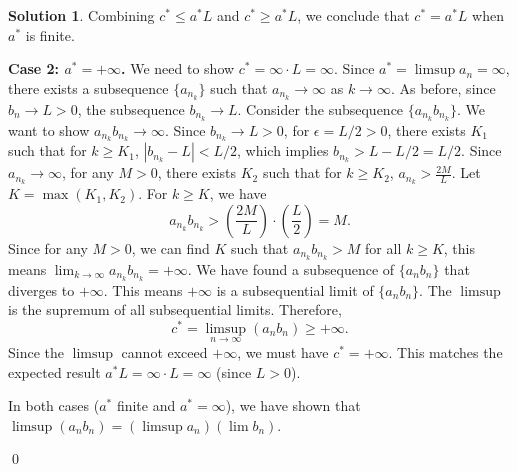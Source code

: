 \documentclass[12pt,oneside]{article}
\theoremstyle{definition}
\newtheorem*{solution}{Solution} %
\begin{document}
\begin{solution}
Combining $c^* \le a^* L$ and $c^* \ge a^* L$, we conclude that $c^* = a^* L$ when $a^*$ is finite.

\textbf{Case 2: $a^* = +\infty$.}
We need to show $c^* = \infty \cdot L = \infty$.
Since $a^* = \limsup a_n = \infty$, there exists a subsequence $\{a_{n_k}\}$ such that $a_{n_k} \to \infty$ as $k \to \infty$.
As before, since $b_n \to L > 0$, the subsequence $b_{n_k} \to L$.
Consider the subsequence $\{a_{n_k} b_{n_k}\}$. We want to show $a_{n_k} b_{n_k} \to \infty$.
Since $b_{n_k} \to L > 0$, for $\epsilon = L/2 > 0$, there exists $K_1$ such that for $k \ge K_1$, $|b_{n_k} - L| < L/2$, which implies $b_{n_k} > L - L/2 = L/2$.
Since $a_{n_k} \to \infty$, for any $M > 0$, there exists $K_2$ such that for $k \ge K_2$, $a_{n_k} > \frac{2M}{L}$.
Let $K = \max(K_1, K_2)$. For $k \ge K$, we have
\[ a_{n_k} b_{n_k} > \left( \frac{2M}{L} \right) \cdot \left( \frac{L}{2} \right) = M. \]
Since for any $M > 0$, we can find $K$ such that $a_{n_k} b_{n_k} > M$ for all $k \ge K$, this means $\lim_{k\to\infty} a_{n_k} b_{n_k} = +\infty$.
We have found a subsequence of $\{a_n b_n\}$ that diverges to $+\infty$. This means $+\infty$ is a subsequential limit of $\{a_n b_n\}$.
The $\limsup$ is the supremum of all subsequential limits. Therefore,
\[ c^* = \limsup_{n\rightarrow \infty} (a_n b_n) \ge +\infty. \]
Since the $\limsup$ cannot exceed $+\infty$, we must have $c^* = +\infty$.
This matches the expected result $a^* L = \infty \cdot L = \infty$ (since $L>0$).

In both cases ($a^*$ finite and $a^* = \infty$), we have shown that $\limsup (a_n b_n) = (\limsup a_n) (\lim b_n)$.
\end{solution}
\qed
\end{document}
